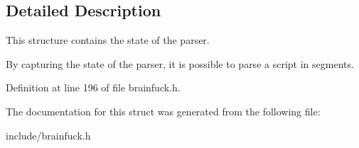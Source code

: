 \subsection{Detailed Description}
This structure contains the state of the parser. 

By capturing the state of the parser, it is possible to parse a script in segments. 

Definition at line 196 of file brainfuck.\+h.



The documentation for this struct was generated from the following file\+:\begin{DoxyCompactItemize}
\item 
include/brainfuck.\+h\end{DoxyCompactItemize}

